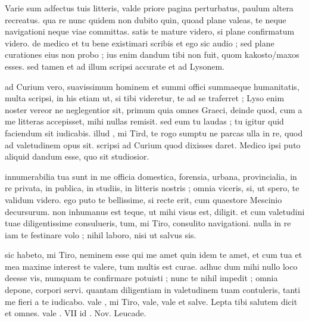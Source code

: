 


 Varie sum adfectus tuis litteris, valde priore pagina perturbatus, paulum altera recreatus. qua re nunc quidem non dubito quin, quoad plane valeas, te neque navigationi neque viae committas. satis te mature videro, si plane confirmatum videro. de medico et tu bene existimari scribis et ego sic audio ; sed plane curationes eius non probo ; ius enim dandum tibi non fuit, quom kakosto/maxos esses. sed tamen et ad illum scripsi accurate et ad Lysonem.

 ad Curium vero, suavissimum hominem et summi offici summaeque humanitatis, multa scripsi, in his etiam ut, si tibi videretur, te ad se traferret ; Lyso enim noster vereor ne neglegentior sit, primum quia omnes Graeci, deinde quod, cum a me litteras accepisset, mihi nullas remisit. sed eum tu laudas ; tu igitur quid faciendum sit iudicabis. illud , mi Tird, te rogo sumptu ne parcas ulla in re, quod ad valetudinem opus sit. scripsi ad Curium quod dixisses daret. Medico ipsi puto aliquid dandum esse, quo sit studiosior.

 innumerabilia tua sunt in me officia domestica, forensia, urbana, provincialia, in re privata, in publica, in studiis, in litteris nostris ; omnia viceris, si, ut spero, te validum videro. ego puto te bellissime, si recte erit, cum quaestore Mescinio decursurum. non inhumanus est teque, ut mihi visus est, diligit. et cum valetudini tuae diligentissime consulueris, tum, mi Tiro, consulito navigationi. nulla in re iam te festinare volo ; nihil laboro, nisi ut salvus sis.

 sic habeto, mi Tiro, neminem esse qui me amet quin idem te amet, et cum tua et mea maxime interest te valere, tum multis est curae. adhuc dum mihi nullo loco deesse vis, numquam te confirmare potuisti ; nunc te nihil impedit ; omnia depone, corpori servi. quantam diligentiam in valetudinem tuam contuleris, tanti me fieri a te iudicabo. vale , mi Tiro, vale, vale et salve. Lepta tibi salutem dicit et omnes. vale . VII id . Nov. Leucade.
